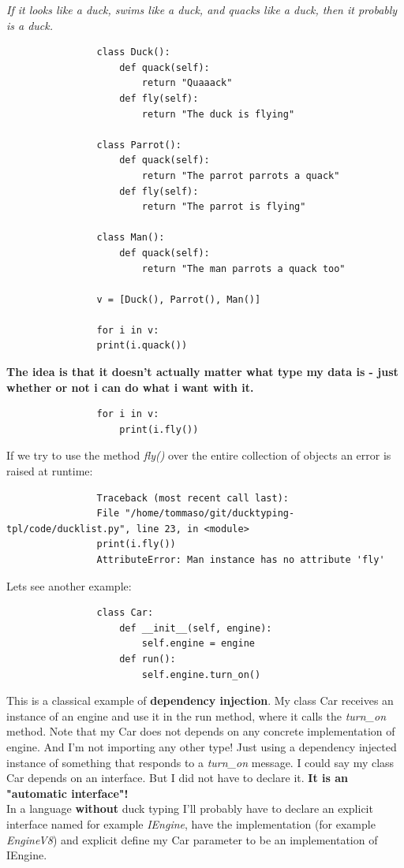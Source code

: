 \documentclass[12pt]{article}
\begin{document}
			\textit{ If it looks like a duck, swims like a duck, and quacks like a duck, then it probably is a duck.}\\
			
			\begin{lstlisting}
				class Duck():
					def quack(self):
						return "Quaaack"
					def fly(self):
						return "The duck is flying"
				
				class Parrot():
					def quack(self):
						return "The parrot parrots a quack"
					def fly(self):
						return "The parrot is flying"
				
				class Man():
					def quack(self):
						return "The man parrots a quack too"
				
				v = [Duck(), Parrot(), Man()]
				
				for i in v:
				print(i.quack())
			\end{lstlisting}
			
			\textbf{The idea is that it doesn't actually matter what type my data is - just whether or not i can do what i want with it.}\\
			
			\begin{lstlisting}	
				for i in v:
					print(i.fly())
			\end{lstlisting}
			
			If we try to use the method \textit{fly()} over the entire collection of objects an error is raised at runtime:
			
			\begin{lstlisting}
				Traceback (most recent call last):
				File "/home/tommaso/git/ducktyping-tpl/code/ducklist.py", line 23, in <module>
				print(i.fly())
				AttributeError: Man instance has no attribute 'fly'
			\end{lstlisting}
			
			Lets see another example:
			
			\begin{lstlisting}
				class Car:
					def __init__(self, engine):
						self.engine = engine
					def run():
						self.engine.turn_on()			
			\end{lstlisting}
			
			This is a classical example of \textbf{dependency injection}. My class Car receives an instance of an engine and use it in the run method, where it calls the \textit{turn\_on} method. Note that my Car does not depends on any concrete implementation of engine. And I'm not importing any other type! Just using a dependency injected instance of something that responds to a \textit{turn\_on} message. I could say my class Car depends on an interface. But I did not have to declare it. \textbf{It is an "automatic interface"!}\\
			In a language \textbf{without} duck typing I'll probably have to declare an explicit interface named for example \textit{IEngine}, have the implementation (for example \textit{EngineV8}) and explicit define my Car parameter to be an implementation of IEngine.
			
\end{document}
